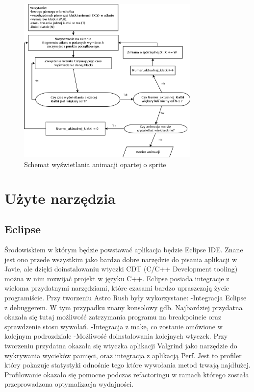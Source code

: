 \begin{figure}[h]
    \centering
    \includegraphics[width=0.8\textwidth,natwidth=410,natheight=142]{./Pictures/sprite_algorytm.png}
    \caption{Schemat wyświetlania animacji opartej o sprite}
\end{figure}


\section{Użyte narzędzia}

\subsection{Eclipse}
Środowiskiem w którym będzie powstawać aplikacja będzie Eclipse IDE. Znane jest ono przede wszystkim jako bardzo dobre narzędzie do pisania aplikacji
w Javie, ale dzięki doinstalowaniu wtyczki CDT (C/C++ Development tooling) można w nim rozwijać projekt w języku C++. Eclipse posiada integracje z
wieloma przydatnymi narzędziami, które czasami bardzo upraszczają życie programiście. Przy tworzeniu Astro Rush były wykorzystane:
-Integracja Eclipse z debuggerem. W tym przypadku znany konsolowy gdb.
Najbardziej przydatna okazała się tutaj możliwość zatrzymania programu na breakpoincie oraz sprawdzenie stosu wywołań.
-Integracja z make, co zostanie omówione w kolejnym podrozdziale
-Możliwość doinstalowania kolejnych wtyczek. Przy tworzeniu przydatna
okazała się wtyczka aplikacji Valgrind jako narzędzie do wykrywania wycieków pamięci, oraz integracja z aplikacją Perf. Jest to profiler który
pokazuje statystyki odnośnie tego które wywołania metod trwają najdłużej. Profilowanie okazało się pomocne podczas refactoringu w ramach którego
została przeprowadzona optymalizacja wydajności.


